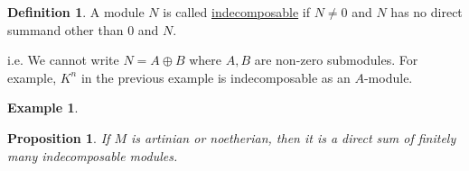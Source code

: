 \documentclass{article}
\theoremstyle{definition}
\newtheorem*{example}{Example}
\newtheorem*{definition}{Definition}
\theoremstyle{plain}
\newtheorem{proposition}[theorem]{Proposition}
\theoremstyle{remark}
\begin{document}
    \begin{definition}
        A module \(N\) is called \underline{indecomposable} if \(N\neq 0\) and \(N\) has no direct summand other than \(0\) and \(N\).

        i.e. We cannot write \(N = A \oplus B\) where \(A, B\) are non-zero submodules. For example, \(K^n\) in the previous example is indecomposable as an \(A\)-module.
    \end{definition}

    \begin{example}
    \end{example}

    \begin{proposition}
        If \(M\) is artinian or noetherian, then it is a direct sum of finitely many indecomposable modules.
    \end{proposition}
\end{document}
